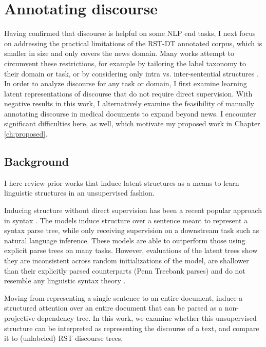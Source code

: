 \section{Annotating discourse} 
Having confirmed that discourse is helpful on some NLP end tasks, I next focus on addressing the practical limitations of the RST-DT annotated corpus, which is smaller in size and only covers the news domain. Many works attempt to circumvent these restrictions, for example by tailoring the label taxonomy to their domain or task, or by considering only intra vs. inter-sentential structures \cite{daCunha:2007,Bhatia:2015,Hogenboom:2015}. In order to analyze discourse for any task or domain, I first  examine learning latent representations of discourse that do not require direct supervision. With negative results in this work, I alternatively examine the feasibility of manually annotating discourse in medical documents to expand beyond news. I encounter significant difficulties here, as well, which motivate my proposed work in Chapter \ref{ch:proposed}.

\subsection{Background}
I here review prior works that induce latent structures as a means to learn linguistic structures in an unsupervised fashion.

 Inducing structure without direct supervision has been a recent popular approach in syntax \cite{Yogatama:2017,Choi:2018,Bisk:2018}. The models induce structure over a sentence meant to represent a syntax parse tree, while only receiving supervision on a downstream task such as natural language inference. These models are able to outperform those using explicit parse trees on many tasks. However, evaluations of the latent trees show they are inconsistent across random initializations of the model, are shallower than their explicitly parsed counterparts (Penn Treebank parses) and do not resemble any linguistic syntax theory \cite{Williams:2018}.

Moving from representing a single sentence to an entire document,  induce a structured attention over an entire document that can be parsed as a non-projective dependency tree. In this work, we examine whether this unsupervised structure can be interpreted as representing the discourse of a text, and compare it to (unlabeled) RST discourse trees.

